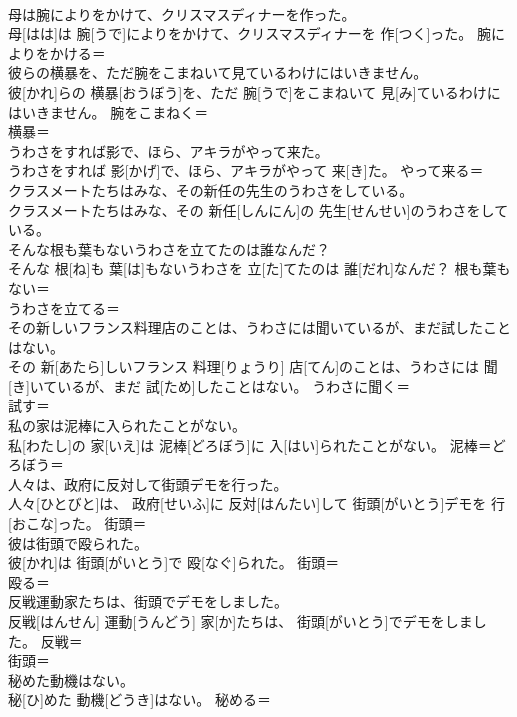 \documentclass[8pt]{extreport}
\begin{document}
\begin{CJK}{UTF8}{min}
\\	母は腕によりをかけて、クリスマスディナーを作った。	
\\	母[はは]は 腕[うで]によりをかけて、クリスマスディナーを 作[つく]った。	腕によりをかける＝ 
\\	彼らの横暴を、ただ腕をこまねいて見ているわけにはいきません。	
\\	彼[かれ]らの 横暴[おうぼう]を、ただ 腕[うで]をこまねいて 見[み]ているわけにはいきません。	腕をこまねく＝ 
\\	横暴＝ 
\\	うわさをすれば影で、ほら、アキラがやって来た。	
\\	うわさをすれば 影[かげ]で、ほら、アキラがやって 来[き]た。	やって来る＝ 
\\	クラスメートたちはみな、その新任の先生のうわさをしている。	
\\	クラスメートたちはみな、その 新任[しんにん]の 先生[せんせい]のうわさをしている。	
\\	そんな根も葉もないうわさを立てたのは誰なんだ？	
\\	そんな 根[ね]も 葉[は]もないうわさを 立[た]てたのは 誰[だれ]なんだ？	根も葉もない＝ 
\\	うわさを立てる＝ 
\\	その新しいフランス料理店のことは、うわさには聞いているが、まだ試したことはない。	
\\	その 新[あたら]しいフランス 料理[りょうり] 店[てん]のことは、うわさには 聞[き]いているが、まだ 試[ため]したことはない。	うわさに聞く＝ 
\\	試す＝ 
\\	私の家は泥棒に入られたことがない。	
\\	私[わたし]の 家[いえ]は 泥棒[どろぼう]に 入[はい]られたことがない。	泥棒＝どろぼう＝ 
\\	人々は、政府に反対して街頭デモを行った。	
\\	人々[ひとびと]は、 政府[せいふ]に 反対[はんたい]して 街頭[がいとう]デモを 行[おこな]った。	街頭＝ 
\\	彼は街頭で殴られた。	
\\	彼[かれ]は 街頭[がいとう]で 殴[なぐ]られた。	街頭＝ 
\\	殴る＝ 
\\	反戦運動家たちは、街頭でデモをしました。	
\\	反戦[はんせん] 運動[うんどう] 家[か]たちは、 街頭[がいとう]でデモをしました。	反戦＝ 
\\	街頭＝ 
\\	秘めた動機はない。	
\\	秘[ひ]めた 動機[どうき]はない。	秘める＝ 

\end{CJK}
\end{document}
